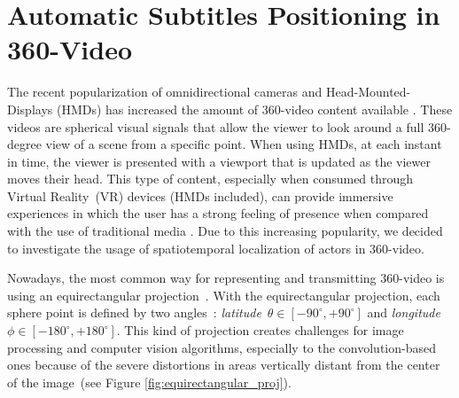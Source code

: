 \section{Automatic Subtitles Positioning in 360-Video}

The recent popularization of omnidirectional cameras and Head-Mounted-Displays (HMDs) has increased the amount of 360-video content available \cite{mendes2020authoring}. These videos are spherical visual signals that allow the viewer to look around a full 360-degree view of a scene from a specific point. When using HMDs, at each instant in time, the viewer is presented with a viewport that is updated as the viewer moves their head. This type of content, especially when consumed through Virtual Reality~(VR) devices (HMDs included), can provide immersive experiences in which the user has a strong feeling of presence when compared with the use of traditional media \cite{montagud_culture_2020}. Due to this increasing popularity, we decided to investigate the usage of spatiotemporal localization of actors in 360-video.

Nowadays, the most common way for representing and transmitting 360-video is using an equirectangular projection~\cite{yang2018object}. With the equirectangular projection, each sphere point is defined by two angles~\cite{snyder1987map}: \emph{latitude}~$\theta \in [-90^{\circ}, +90^{\circ}]$ and \emph{longitude}~$\phi \in [-180^{\circ}, +180^{\circ}]$. This kind of projection creates challenges for image processing and computer vision algorithms, especially to the convolution-based ones because of the severe distortions in areas vertically distant from the center of the image~(see Figure \ref{fig:equirectangular_proj}).


